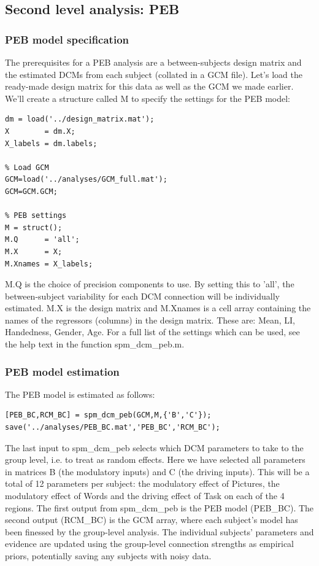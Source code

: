 \documentclass{article}
\begin{document}
\subsection{Second level analysis: PEB}

\subsubsection{PEB model specification}
The prerequisites for a PEB analysis are a between-subjects design matrix and the estimated DCMs from each subject (collated in a GCM file). Let's load the ready-made design matrix for this data as well as the GCM we made earlier. We'll create a structure called M to specify the settings for the PEB model:

\begin{lstlisting}[style=Matlab-editor,caption=PEB specification]
% Load design matrix
dm = load('../design_matrix.mat');
X        = dm.X;
X_labels = dm.labels;

% Load GCM
GCM=load('../analyses/GCM_full.mat');
GCM=GCM.GCM;

% PEB settings
M = struct();
M.Q      = 'all';
M.X      = X;
M.Xnames = X_labels;
\end{lstlisting}

M.Q is the choice of precision components to use. By setting this to 'all', the between-subject variability for each DCM connection will be individually estimated. M.X is the design matrix and M.Xnames is a cell array containing the names of the regressors (columns) in the design matrix. These are: Mean, LI, Handedness, Gender, Age. For a full list of the settings which can be used, see the help text in the function spm\_dcm\_peb.m. 

\subsubsection{PEB model estimation}
The PEB model is estimated as follows:

\begin{lstlisting}[style=Matlab-editor,caption=PEB estimation]
[PEB_BC,RCM_BC] = spm_dcm_peb(GCM,M,{'B','C'});
save('../analyses/PEB_BC.mat','PEB_BC','RCM_BC');
\end{lstlisting}

The last input to spm\_dcm\_peb selects which DCM parameters to take to the group level, i.e. to treat as random effects. Here we have selected all parameters in matrices B (the modulatory inputs) and C (the driving inputs). This will be a total of 12 parameters per subject: the modulatory effect of Pictures, the modulatory effect of Words and the driving effect of Task on each of the 4 regions. The first output from spm\_dcm\_peb is the PEB model (PEB\_BC). The second output (RCM\_BC) is the GCM array, where each subject's model has been finessed by the group-level analysis. The individual subjects' parameters and evidence are updated using the group-level connection strengths as empirical priors, potentially saving any subjects with noisy data.
\end{document}

